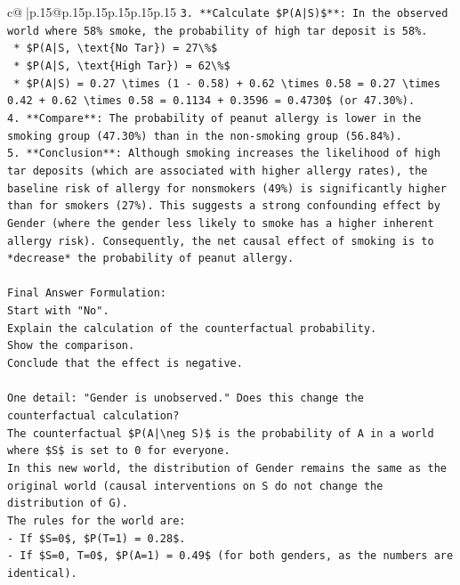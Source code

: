 \documentclass{article}
\begin{document}
{\begin{supertabular}{c@{$\;$}|p{.15\linewidth}@{}p{.15\linewidth}p{.15\linewidth}p{.15\linewidth}p{.15\linewidth}p{.15\linewidth}}
{{{\texttt{3.  **Calculate \$P(A|S)\$**: In the observed world where 58\% smoke, the probability of high tar deposit is 58\%.} \\
\texttt{    *   \$P(A|S, \textbackslash{}text\{No Tar\}) = 27\textbackslash{}\%\$} \\
\texttt{    *   \$P(A|S, \textbackslash{}text\{High Tar\}) = 62\textbackslash{}\%\$} \\
\texttt{    *   \$P(A|S) = 0.27 \textbackslash{}times (1 {-} 0.58) + 0.62 \textbackslash{}times 0.58 = 0.27 \textbackslash{}times 0.42 + 0.62 \textbackslash{}times 0.58 = 0.1134 + 0.3596 = 0.4730\$ (or 47.30\%).} \\
\texttt{4.  **Compare**: The probability of peanut allergy is lower in the smoking group (47.30\%) than in the non{-}smoking group (56.84\%).} \\
\texttt{5.  **Conclusion**: Although smoking increases the likelihood of high tar deposits (which are associated with higher allergy rates), the baseline risk of allergy for nonsmokers (49\%) is significantly higher than for smokers (27\%). This suggests a strong confounding effect by Gender (where the gender less likely to smoke has a higher inherent allergy risk). Consequently, the net causal effect of smoking is to *decrease* the probability of peanut allergy.} \\
\\ 
\texttt{Final Answer Formulation:} \\
\texttt{Start with "No".} \\
\texttt{Explain the calculation of the counterfactual probability.} \\
\texttt{Show the comparison.} \\
\texttt{Conclude that the effect is negative.} \\
\\ 
\texttt{One detail: "Gender is unobserved." Does this change the counterfactual calculation?} \\
\texttt{The counterfactual \$P(A|\textbackslash{}neg S)\$ is the probability of A in a world where \$S\$ is set to 0 for everyone.} \\
\texttt{In this new world, the distribution of Gender remains the same as the original world (causal interventions on S do not change the distribution of G).} \\
\texttt{The rules for the world are:} \\
\texttt{{-} If \$S=0\$, \$P(T=1) = 0.28\$.} \\
\texttt{{-} If \$S=0, T=0\$, \$P(A=1) = 0.49\$ (for both genders, as the numbers are identical).} \\
}}}
\end{supertabular}}
\end{document}
